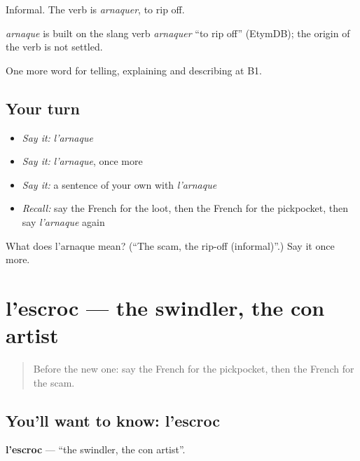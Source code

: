 Informal. The verb is \emph{arnaquer}, to rip off.

\begin{cousinweb}
\emph{arnaque} is built on the slang verb \emph{arnaquer} \textquotedblleft{}to rip off\textquotedblright{} (EtymDB); the origin of the verb is not settled.
\end{cousinweb}

\begin{grammarlens}[title={What you've built}]
One more word for telling, explaining and describing at B1.
\end{grammarlens}

\subsection*{Your turn}
\begin{itemize}
\raggedright
  \item \emph{Say it:} \emph{l'arnaque}
  \item \emph{Say it:} \emph{l'arnaque}, once more
  \item \emph{Say it:} a sentence of your own with \emph{l'arnaque}
  \item \emph{Recall:} say the French for the loot, then the French for the pickpocket, then say \emph{l'arnaque} again
\end{itemize}

\begin{tcolorbox}[breakable,colback=teal!4,colframe=teal!35!black,title={Before you move on}]
What does l'arnaque mean? (\textquotedblleft{}The scam, the rip-off (informal)\textquotedblright{}.) Say it once more.
\end{tcolorbox}
\section[l'escroc]{l'escroc — the swindler, the con artist}

\label{lesson:FR-C288-escroc}



\begin{quote}
Before the new one: say the French for the pickpocket, then the French for the scam.
\end{quote}

\subsection*{You'll want to know: l'escroc}
\textbf{l'escroc} — \textquotedblleft{}the swindler, the con artist\textquotedblright{}.

